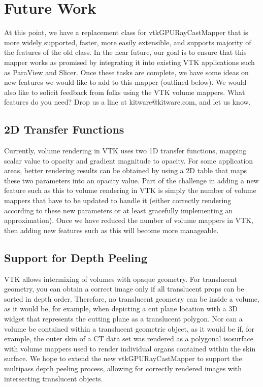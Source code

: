 \section{Future Work}
\label{future-work}
At this point, we have a replacement class for vtkGPURayCastMapper that is more
widely supported, faster, more easily extensible, and supports majority of the
features of the old class. In the near future, our goal is to ensure that this
mapper works as promised by integrating it into existing VTK applications such
as ParaView and Slicer. Once these tasks are complete, we have some ideas on new
features we would like to add to this mapper (outlined below). We would also
like to solicit feedback from folks using the VTK volume mappers. What features
do you need? Drop us a line at kitware@kitware.com, and let us know.

\subsection{2D Transfer Functions}
\label{2d-transfer-functions}
Currently, volume rendering in VTK uses two 1D transfer functions, mapping
scalar value to opacity and gradient magnitude to opacity. For some application
areas, better rendering results can be obtained by using a 2D table that maps
these two parameters into an opacity value. Part of the challenge in adding a
new feature such as this to volume rendering in VTK is simply the number of
volume mappers that have to be updated to handle it (either correctly rendering
according to these new parameters or at least gracefully implementing an
approximation). Once we
have reduced the number of volume mappers in VTK, then adding new features such
as this will become more manageable.

\subsection{Support for Depth Peeling}
\label{support-for-depth-peeling}
VTK allows intermixing of volumes with opaque geometry. For
translucent geometry, you can obtain a correct image only if all translucent
props can be sorted in depth order. Therefore, no translucent geometry can be
inside a volume, as it would be, for example, when depicting a cut plane
location with a 3D widget that represents the cutting plane as a translucent
polygon.  Nor can a volume be contained within a translucent geometric object,
as it would be if, for example, the outer skin of a CT data set was rendered
as a polygonal isosurface with volume mappers used to render individual organs
contained within the skin surface. We hope to extend the new
vtkGPURayCastMapper to support the multipass depth peeling process, allowing
for correctly rendered images with intersecting translucent objects.

